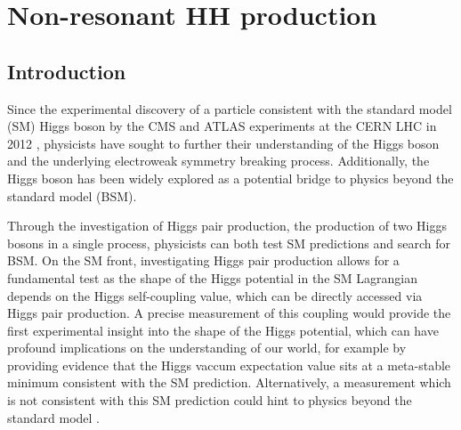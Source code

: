 \chapter{Non-resonant HH production} 

\section{Introduction}\label{section:introduction_HH}
Since the experimental discovery of a particle consistent with the standard model (SM) Higgs boson by the CMS and ATLAS experiments at the CERN 
LHC in 2012 \cite{Aad:2012tfa,Chatrchyan:2012ufa,Chatrchyan:2013lba}, physicists
have sought to further their understanding of the Higgs boson and the underlying electroweak symmetry breaking process. Additionally, the Higgs boson
has been widely explored as a potential bridge to physics beyond the standard model (BSM).

Through the investigation of Higgs pair production, the production of two Higgs bosons in a single process, physicists can both test SM predictions and 
search for BSM. On the SM front, investigating Higgs pair production allows for a fundamental test as the shape of the Higgs potential in the SM Lagrangian 
depends on the Higgs self-coupling value, which can be directly accessed via Higgs pair production. A precise measurement of this coupling would provide the first experimental insight 
into the shape of the Higgs potential, which can have profound implications on the understanding of our world, for example by providing evidence that the Higgs vaccum expectation value sits at a 
meta-stable minimum consistent with the SM prediction. Alternatively, a measurement which is not consistent with this SM prediction could hint to physics beyond the standard model \cite{10.3389/fspas.2018.00040}. 

